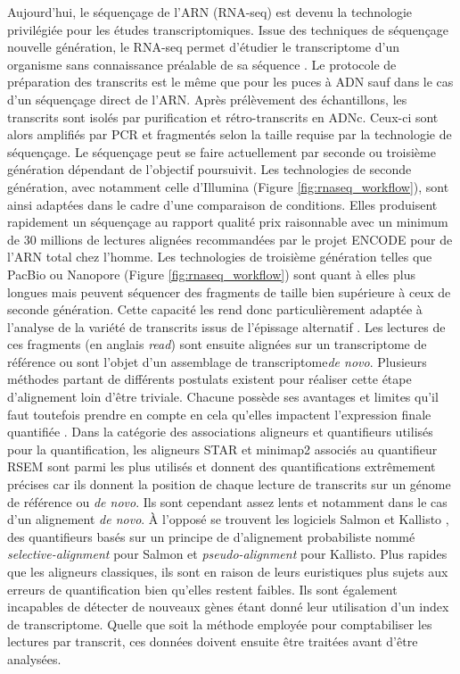 Aujourd'hui, le séquençage de l'ARN (RNA-seq) est devenu la technologie privilégiée pour les études transcriptomiques. Issue des techniques de séquençage nouvelle génération, le RNA-seq permet d'étudier le transcriptome d'un organisme sans connaissance préalable de sa séquence \cite{Wang2009Jan}. Le protocole de préparation des transcrits est le même que pour les puces à ADN sauf dans le cas d'un séquençage direct de l'ARN. Après prélèvement des échantillons, les transcrits sont isolés par purification et rétro-transcrits en ADNc. Ceux-ci sont alors amplifiés par PCR et fragmentés selon la taille requise par la technologie de séquençage. Le séquençage peut se faire actuellement par seconde ou troisième génération dépendant de l'objectif poursuivit. Les technologies de seconde génération, avec notamment celle d'Illumina (Figure \ref{fig:rnaseq_workflow}), sont ainsi adaptées dans le cadre d'une comparaison de conditions. Elles produisent rapidement un séquençage au rapport qualité prix raisonnable avec un minimum de 30 millions de lectures alignées recommandées par le projet ENCODE \cite{ENCODE2012} pour de l'ARN total chez l'homme. Les technologies de troisième génération telles que PacBio ou Nanopore (Figure \ref{fig:rnaseq_workflow}) sont quant à elles plus longues mais peuvent séquencer des fragments de taille bien supérieure à ceux de seconde génération. Cette capacité les rend donc particulièrement adaptée à l'analyse de la variété de transcrits issus de l'épissage alternatif \cite{Bergsma2018Jan}. Les lectures de ces fragments (en anglais \textit{read}) sont ensuite alignées sur un transcriptome de référence ou sont l'objet d'un assemblage de transcriptome\textit{de novo}. Plusieurs méthodes partant de différents postulats existent pour réaliser cette étape d'alignement loin d'être triviale. Chacune possède ses avantages et limites qu'il faut toutefois prendre en compte en cela qu'elles impactent l'expression finale quantifiée \cite{Yi2018Oct,Srivastava2020Dec}. Dans la catégorie des associations aligneurs et quantifieurs utilisés pour la quantification, les aligneurs STAR \cite{Dobin2013Jan} et minimap2 \cite{Li2018Sep} associés au quantifieur RSEM \cite{Li2011Dec} sont parmi les plus utilisés et donnent des quantifications extrêmement précises car ils donnent la position de chaque lecture de transcrits sur un génome de référence ou \textit{de novo}. Ils sont cependant assez lents et notamment dans le cas d'un alignement \textit{de novo}. À l'opposé se trouvent les logiciels Salmon \cite{Patro2017Apr} et Kallisto \cite{Bray2016May}, des quantifieurs basés sur un principe de d'alignement probabiliste nommé \textit{selective-alignment} pour Salmon et \textit{pseudo-alignment} pour Kallisto. Plus rapides que les aligneurs classiques, ils sont en raison de leurs euristiques plus sujets aux erreurs de quantification bien qu'elles restent faibles. Ils sont également incapables de détecter de nouveaux gènes étant donné leur utilisation d'un index de transcriptome. Quelle que soit la méthode employée pour comptabiliser les lectures par transcrit, ces données doivent ensuite être traitées avant d'être analysées.


